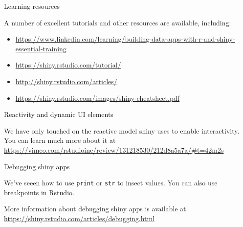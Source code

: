 \documentclass[
  12pt,
  ignorenonframetext,
]{beamer}
\begin{document}
\begin{frame}{Learning resources}
\protect\hypertarget{learning-resources}{}

A number of excellent tutorials and other resources are available,
including:

\begin{itemize}
\item
  \url{https://www.linkedin.com/learning/building-data-apps-with-r-and-shiny-essential-training}
\item
  \url{https://shiny.rstudio.com/tutorial/}
\item
  \url{http://shiny.rstudio.com/articles/}
\item
  \url{https://shiny.rstudio.com/images/shiny-cheatsheet.pdf}
\end{itemize}

\end{frame}

\begin{frame}{Reactivity and dynamic UI elements}
\protect\hypertarget{reactivity-and-dynamic-ui-elements}{}

We have only touched on the reactive model shiny uses to enable
interactivity. You can learn much more about it at
\url{https://vimeo.com/rstudioinc/review/131218530/212d8a5a7a/\#t=42m2s}

\end{frame}

\begin{frame}[fragile]{Debugging shiny apps}
\protect\hypertarget{debugging-shiny-apps}{}

We've seeen how to use \texttt{print} or \texttt{str} to insect values.
You can also use breakpoints in Rstudio.

More information about debugging shiny apps is available at
\url{https://shiny.rstudio.com/articles/debugging.html}

\end{frame}
\end{document}
